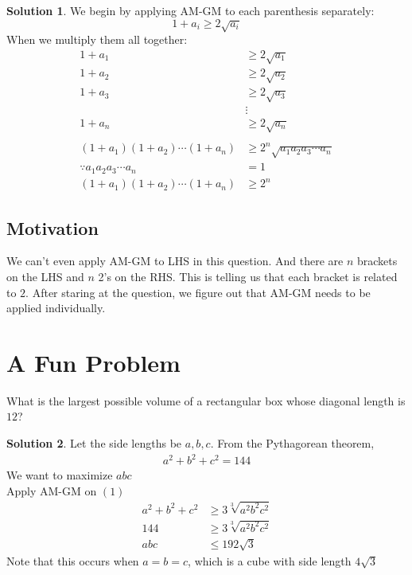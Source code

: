 \documentclass{article}
\theoremstyle{definition}
\newtheorem*{solution}{\color{blue}Solution}
\begin{document}
\begin{solution}
    We begin by applying AM-GM to each parenthesis separately:
    $$1+a_i\ge 2\sqrt{a_i}$$
    When we multiply them all together:
    \begin{align*}
        1+a_1&\ge 2\sqrt{a_1}\\
        1+a_2&\ge 2\sqrt{a_2}\\
        1+a_3&\ge 2\sqrt{a_3}\\
        &\vdots\\
        1+a_n&\ge 2\sqrt{a_n}\\\\
        \left(1+a_1\right)\left(1+a_2\right)\cdots \left(1+a_n\right)&\ge 2^n\sqrt{a_1a_2a_3\cdots a_n}\\
    \because a_1a_2a_3\cdots a_n&= 1\\
    \left(1+a_1\right)\left(1+a_2\right)\cdots \left(1+a_n\right)&\ge 2^n
    \end{align*}
\end{solution}
\subsection*{Motivation}
We can't even apply AM-GM to LHS in this question. And there are $n$ brackets on the LHS and $n$ 2's on the RHS. This is telling us that each bracket is related to $2$. After staring at the question, we figure out that AM-GM needs to be applied individually.
\pagebreak


\section{A Fun Problem}
\begin{tcolorbox}
    What is the largest possible volume of a rectangular box whose diagonal length is $12$?
\end{tcolorbox}

\begin{solution}
    Let the side lengths be $a,b,c$. From the Pythagorean theorem, 
    \begin{align}
        a^2+b^2+c^2=144
    \end{align}
    We want to maximize $abc$\\
    Apply AM-GM on $(1)$
    \begin{align*}
        a^2+b^2+c^2&\ge 3\sqrt[3]{a^2b^2c^2}\\
        144&\ge 3\sqrt[3]{a^2b^2c^2}\\
        abc&\leq 192\sqrt{3}
    \end{align*}
    Note that this occurs when $a=b=c$, which is a cube with side length $4\sqrt{3}$
\end{solution}\bigskip\bigskip
\end{document}

